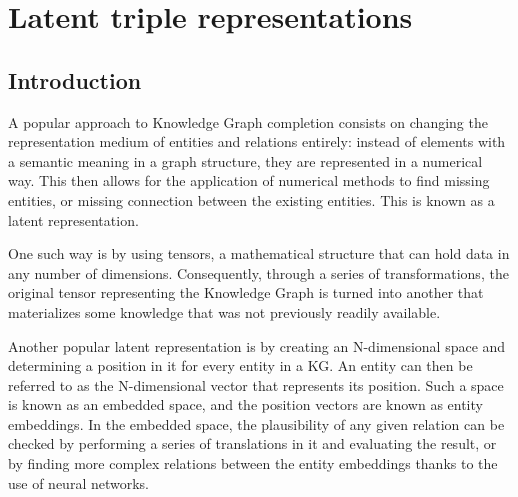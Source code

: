 \chapter{Latent triple representations}\label{chap:embeddings}



\section{Introduction}\label{sec:emb-intro}
A popular approach to Knowledge Graph completion consists on changing the representation medium of entities and relations entirely: instead of elements with a semantic meaning in a graph structure, they are represented in a numerical way. This then allows for the application of numerical methods to find missing entities, or missing connection between the existing entities. This is known as a latent representation.

One such way is by using tensors, a mathematical structure that can hold data in any number of dimensions. Consequently, through a series of transformations, the original tensor representing the Knowledge Graph is turned into another that materializes some knowledge that was not previously readily available.

Another popular latent representation is by creating an N-dimensional space and determining a position in it for every entity in a KG. An entity can then be referred to as the N-dimensional vector that represents its position. Such a space is known as an embedded space, and the position vectors are known as entity embeddings. In the embedded space, the plausibility of any given relation can be checked by performing a series of translations in it and evaluating the result, or by finding more complex relations between the entity embeddings thanks to the use of neural networks.

